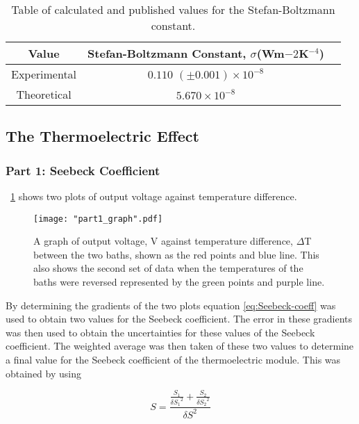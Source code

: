 \documentclass{article}
\newcommand{\figref}[2][\figurename~]{#1\ref{#2}}
\begin{document}
\vspace{5mm}
\begin{table*}[h]
\centering %
\caption{Table of calculated and published values for the Stefan-Boltzmann constant.}
\label{tab:table0}
\begin{tabular}{|c|c|c|}
\hline
Value & Stefan-Boltzmann Constant, $\sigma$(Wm${-2}$K$^{-4}$) \\
\hline
Experimental & $0.110$ $( \pm 0.001) \times 10 ^{-8}$ \\
\hline
Theoretical \cite{Book01} & $5.670 \times 10^{-8}$ \\
\hline
\end{tabular}
\end{table*}

\newpage
\subsection{The Thermoelectric Effect}
\label{ssec:thermo-results}

\subsubsection{Part 1: Seebeck Coefficient}
\label{sssec:part1_results}

\figref{fig:part1_graph} shows two plots of output voltage against temperature difference.

\begin{figure}[h]
\centering
\texttt{[image: "part1\_graph".pdf]}
\caption{A graph of output voltage, V against temperature difference, $\Delta$T between the two baths, shown as the red points and blue line. This also shows the second set of data when the temperatures of the baths were reversed represented by the green points and purple line.}
\label{fig:part1_graph}
\end{figure}

\vspace{2mm}
\noindent
By determining the gradients of the two plots equation \eqref{eq:Seebeck-coeff} was used to obtain two values for the Seebeck coefficient. The error in these gradients was then used to obtain the uncertainties for these values of the Seebeck coefficient. The weighted average was then taken of these two values to determine a final value for the Seebeck coefficient of the thermoelectric module. This was obtained by using

\begin{equation}
\label{eq:seebeck-average}
S = \frac{\frac{S_1}{\delta{S_1}^2} + \frac{S_2}{\delta{S_2}^2}}{{\delta S}^2}
\end{equation}
\end{document}
